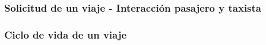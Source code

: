 \subsubsection{Solicitud de un viaje - Interacci\'on pasajero y taxista}




\subsubsection{Ciclo de vida de un viaje}
\label{fsm:ciclovidaviaje}

